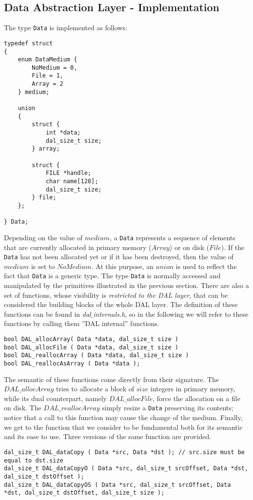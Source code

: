 \subsection{Data Abstraction Layer - Implementation}
\label{DAL-impl}
The type \texttt{Data} is implemented as follows:
\begin{lstlisting}
typedef struct
{
	enum DataMedium {
		NoMedium = 0,
		File = 1,
		Array = 2
	} medium;
	
	union 
	{
		struct {
			int *data;
			dal_size_t size;
		} array;
		
		struct {
			FILE *handle;
			char name[128];
			dal_size_t size;
		} file;
	};
	
} Data;
\end{lstlisting}
Depending on the value of $medium$, a \texttt{Data} represents a sequence of elements that are currently allocated in primary memory ($Array$) or on disk ($File$). If the \texttt{Data} has not been allocated yet or if it has been destroyed, then the value of $medium$ is set to $NoMedium$. At this purpose, an $union$ is used to reflect the fact that \texttt{Data} is a generic type. The type \texttt{Data} is normally accessed and manipulated by the primitives illustrated in the previous section. There are also a set of functions, whose visibility is \textit{restricted to the DAL layer}, that can be considered the building blocks of the whole DAL layer. The definition of these functions can be found in \textit{dal$\_$internals.h}, so in the following we will refer to these functions by calling them ''DAL internal'' functions.
\begin{lstlisting}
bool DAL_allocArray( Data *data, dal_size_t size )
bool DAL_allocFile ( Data *data, dal_size_t size )
bool DAL_reallocArray ( Data *data, dal_size_t size )
bool DAL_reallocAsArray ( Data *data );
\end{lstlisting}
The semantic of these functions come directly from their signature. The $DAL\_allocArray$ tries to allocate a block of $size$ integers in primary memory, while its dual counterpart, namely $DAL\_allocFile$, force the allocation on a file on disk. The $DAL\_reallocArray$ simply resize a \texttt{Data} preserving its contents; notice that a call to this function may cause the change of the medium. Finally, we get to the function that we consider to be fundamental both for its semantic and its ease to use. Three versions of the same function are provided.
\begin{lstlisting}
dal_size_t DAL_dataCopy ( Data *src, Data *dst ); // src.size must be equal to dst.size
dal_size_t DAL_dataCopyO ( Data *src, dal_size_t srcOffset, Data *dst, dal_size_t dstOffset ); 
dal_size_t DAL_dataCopyOS ( Data *src, dal_size_t srcOffset, Data *dst, dal_size_t dstOffset, dal_size_t size );
\end{lstlisting}
